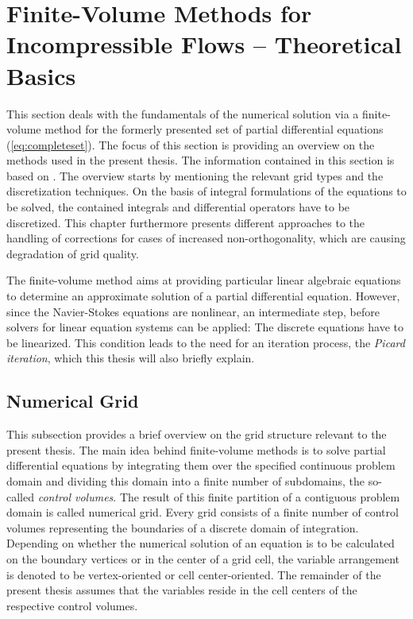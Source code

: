 \section{Finite-Volume Methods for Incompressible Flows -- Theoretical Basics}
\label{sec:fvm}

This section deals with the fundamentals of the numerical solution via a finite-volume method for the formerly presented set of partial differential equations (\ref{eq:completeset}). The focus of this section is providing an overview on the methods used in the present thesis. The information contained in this section is based on \cite{ferziger02,jasak96,schaefer99,muzaferja}. The overview starts by mentioning the relevant grid types and the discretization techniques. On the basis of integral formulations of the equations to be solved, the contained integrals and differential operators have to be discretized. This chapter furthermore presents different approaches to the handling of corrections for cases of increased non-orthogonality, which are causing degradation of grid quality.
  
The finite-volume method aims at providing particular linear algebraic equations to determine an approximate solution of a partial differential equation. However, since the Navier-Stokes equations are nonlinear, an intermediate step, before solvers for linear equation systems can be applied: The discrete equations have to be linearized. This condition leads to the need for an iteration process, the \emph{Picard iteration}, which this thesis will also briefly explain. 
      
\subsection{Numerical Grid}

This subsection provides a brief overview on the grid structure relevant to the present thesis. The main idea behind finite-volume methods is to solve partial differential equations by integrating them over the specified continuous problem domain and dividing this domain into a finite number of subdomains, the so-called \emph{control volumes}. The result of this finite partition of a contiguous problem domain is called numerical grid. Every grid consists of a finite number of control volumes representing the boundaries of a discrete domain of integration. Depending on whether the numerical solution of an equation is to be calculated on the boundary vertices or in the center of a grid cell, the variable arrangement is denoted to be vertex-oriented or cell center-oriented. The remainder of the present thesis assumes that the variables reside in the cell centers of the respective control volumes.

